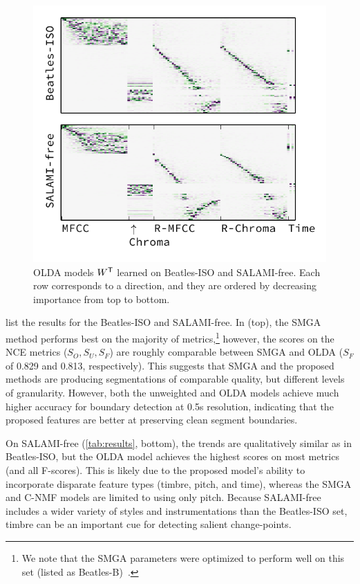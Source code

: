 \documentclass{article}
\begin{document}
\begin{figure}
\flushright%
\includegraphics[width=\columnwidth]{figs/w}%
\vspace{-\baselineskip}%
\caption{OLDA models $W^\mathsf{T}$ learned on Beatles-ISO and SALAMI-free. Each row corresponds to a direction, 
and they are ordered by decreasing importance from top to bottom.\label{fig:w}}
\end{figure}

 list the results for the Beatles-ISO and SALAMI-free.
In  (top), the SMGA method performs best on the majority of metrics,\footnote{We
note that the SMGA parameters were optimized to perform well on this set (listed as
Beatles-B)~\cite{serra2012unsupervised}.}
however, the scores on the NCE metrics ($S_O, S_U, S_F$) are roughly comparable between SMGA and OLDA ($S_F$ of 0.829
and 0.813, respectively). 
This suggests that SMGA and the proposed methods are producing segmentations of comparable quality, but 
different levels of granularity.
However, both the unweighted and OLDA models achieve much higher accuracy for boundary detection at 0.5s resolution,
indicating that the proposed features are better at preserving clean segment boundaries.  

On SALAMI-free (\cref{tab:results}, bottom), the trends are qualitatively similar as in Beatles-ISO, but the OLDA
model achieves the highest scores on most metrics (and all F-scores). This is likely due to the proposed model's
ability to incorporate disparate feature types (timbre, pitch, and time), whereas the SMGA and C-NMF models are
limited to using only pitch. 
Because SALAMI-free includes a wider variety of styles and instrumentations than the Beatles-ISO set, 
timbre can be an important cue for detecting salient change-points.
\end{document}
